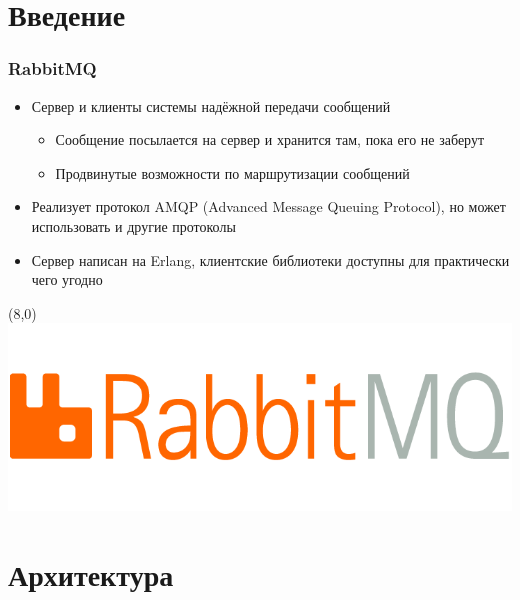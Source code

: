 \documentclass{../../slides-style}
\begin{document}
    \begin{frame}[plain]
        \titlepage
    \end{frame}

    \section{Введение}

    \begin{frame}
        \frametitle{RabbitMQ}
        \begin{itemize}
            \item Сервер и клиенты системы надёжной передачи сообщений
            \begin{itemize}
                \item Сообщение посылается на сервер и хранится там, пока его не заберут
                \item Продвинутые возможности по маршрутизации сообщений
            \end{itemize}
            \item Реализует протокол AMQP (Advanced Message Queuing Protocol), но может использовать и другие протоколы
            \item Сервер написан на Erlang, клиентские библиотеки доступны для практически чего угодно
        \end{itemize}
        \begin{textblock}{3}(8,0)
            \includegraphics[width=\textwidth]{rabbitmqLogo.png}
        \end{textblock}
    \end{frame}

    \section{Архитектура}
\end{document}
